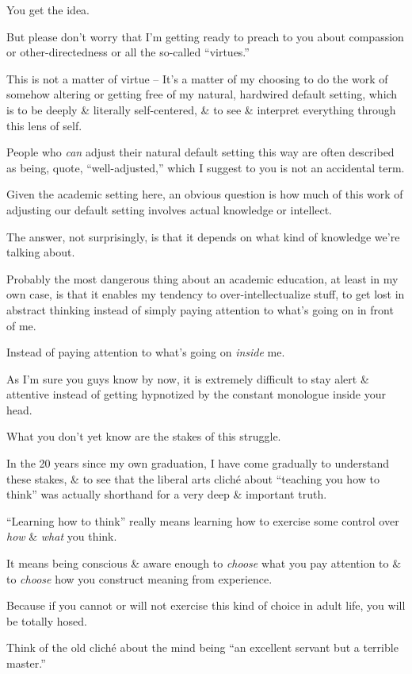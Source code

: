 \documentclass{article}
\numberwithin{equation}{section}
\begin{document}
You get the idea.

But please don't worry that I'm getting ready to preach to you about compassion or other-directedness or all the so-called ``virtues.''

This is not a matter of virtue -- It's a matter of my choosing to do the work of somehow altering or getting free of my natural, hardwired default setting, which is to be deeply \& literally self-centered, \& to see \& interpret everything through this lens of self.

People who \textit{can} adjust their natural default setting this way are often described as being, quote, ``well-adjusted,'' which I suggest to you is not an accidental term.

Given the academic setting here, an obvious question is how much of this work of adjusting our default setting involves actual knowledge or intellect.

The answer, not surprisingly, is that it depends on what kind of knowledge we're talking about.

Probably the most dangerous thing about an academic education, at least in my own case, is that it enables my tendency to over-intellectualize stuff, to get lost in abstract thinking instead of simply paying attention to what's going on in front of me.

Instead of paying attention to what's going on \textit{inside} me.

As I'm sure you guys know by now, it is extremely difficult to stay alert \& attentive instead of getting hypnotized by the constant monologue inside your head.

What you don't yet know are the stakes of this struggle.

In the 20 years since my own graduation, I have come gradually to understand these stakes, \& to see that the liberal arts clich\'e about ``teaching you how to think'' was actually shorthand for a very deep \& important truth.

``Learning how to think'' really means learning how to exercise some control over \textit{how} \& \textit{what} you think.

It means being conscious \& aware enough to \textit{choose} what you pay attention to \& to \textit{choose} how you construct meaning from experience.

Because if you cannot or will not exercise this kind of choice in adult life, you will be totally hosed.

Think of the old clich\'e about the mind being ``an excellent servant but a terrible master.''
\end{document}
